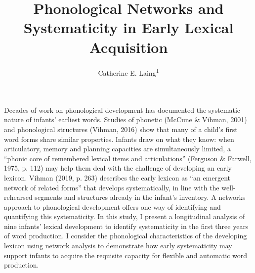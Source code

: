 \documentclass[
  man,mask,floatsintext]{apa6}
\title{Phonological Networks and Systematicity in Early Lexical Acquisition}
\author{Catherine E. Laing\textsuperscript{1}}
\date{}
\affiliation{\vspace{0.5cm}\textsuperscript{1} University of York, York, UK}
\begin{document}
\maketitle

Decades of work on phonological development has documented the systematic nature of infants' earliest words. Studies of phonetic (McCune \& Vihman, 2001) and phonological structures (Vihman, 2016) show that many of a child's first word forms share similar properties. Infants draw on what they know: when articulatory, memory and planning capacities are simultaneously limited, a ``phonic core of remembered lexical items and articulations'' (Ferguson \& Farwell, 1975, p. 112) may help them deal with the challenge of developing an early lexicon. Vihman (2019, p. 263) describes the early lexicon as ``an emergent network of related forms'' that develops systematically, in line with the well-rehearsed segments and structures already in the infant's inventory. A networks approach to phonological development offers one way of identifying and quantifying this systematicity. In this study, I present a longitudinal analysis of nine infants' lexical development to identify systematicity in the first three years of word production. I consider the phonological characteristics of the developing lexicon using network analysis to demonstrate how early systematicity may support infants to acquire the requisite capacity for flexible and automatic word production.
\end{document}
